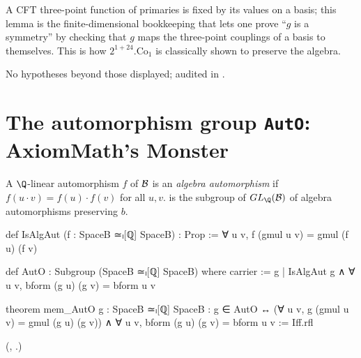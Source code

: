 \begin{physics}
A CFT three-point function of primaries is fixed by its values on a basis; this lemma is the
finite-dimensional bookkeeping that lets one prove ``$g$ is a symmetry'' by checking that $g$ maps the
three-point couplings of a basis to themselves.  This is how $2^{1+24}.\mathrm{Co}_1$ is classically
shown to preserve the algebra.
\end{physics}
\begin{status}
No hypotheses beyond those displayed; audited in .
\end{status}

\section{The automorphism group \texorpdfstring{\texttt{AutO}}{AutO}: AxiomMath's Monster}\label{ch21:sec:auto}

\begin{definition}\label{ch21:def:AutO}
A $\Q$-linear automorphism $f$ of $\mathcal{B}$ is an \emph{algebra automorphism} if
$f(u\cdot v)=f(u)\cdot f(v)$ for all $u,v$.   is the subgroup of $GL_\Q(\chXXIB)$ of algebra
automorphisms preserving $b$.
\end{definition}
\begin{leancode}
def IsAlgAut (f : SpaceB ≃ₗ[ℚ] SpaceB) : Prop := ∀ u v, f (gmul u v) = gmul (f u) (f v)
\end{leancode}
\begin{leancode}
def AutO : Subgroup (SpaceB ≃ₗ[ℚ] SpaceB) where
  carrier := {g | IsAlgAut g ∧ ∀ u v, bform (g u) (g v) = bform u v}
\end{leancode}
\begin{leancode}
theorem mem_AutO {g : SpaceB ≃ₗ[ℚ] SpaceB} :
    g ∈ AutO ↔ (∀ u v, g (gmul u v) = gmul (g u) (g v)) ∧ ∀ u v, bform (g u) (g v) = bform u v :=
  Iff.rfl
\end{leancode}
(,
.)

